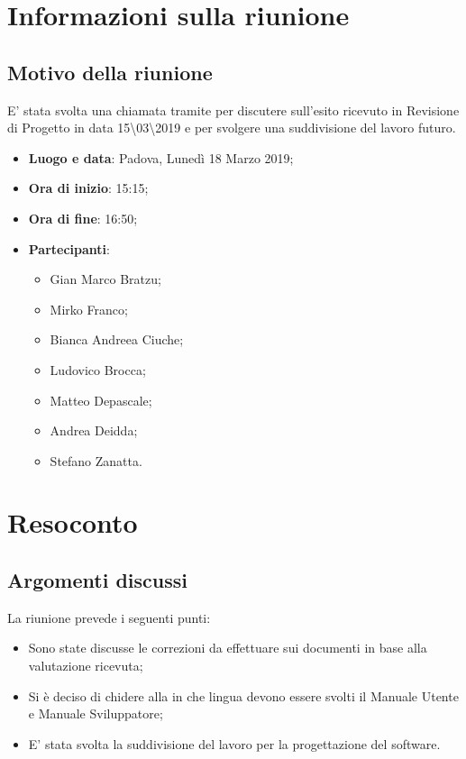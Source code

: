 \documentclass[a4paper,12pt]{article}
\begin{document}
	\tableofcontents
	\cleardoublepage
	\section{Informazioni sulla riunione}
	\subsection{Motivo della riunione} E' stata svolta una chiamata tramite   per discutere sull'esito ricevuto in Revisione di Progetto in data 15\textbackslash03\textbackslash2019 e per svolgere una suddivisione del lavoro futuro.
	\begin{itemize}
		\item \textbf{Luogo e data}: Padova, Lunedì \label{key}18 Marzo 2019;
		\item \textbf{Ora di inizio}: 15:15;
		\item \textbf{Ora di fine}: 16:50;
		\item \textbf{Partecipanti}:  
		\begin{itemize}
			\item Gian Marco Bratzu;
			\item Mirko Franco;
			\item Bianca Andreea Ciuche;
			\item Ludovico Brocca;
			\item Matteo Depascale;
			\item Andrea Deidda;
			\item Stefano Zanatta.
		\end{itemize}
	\end{itemize}
	
	
	\section{Resoconto}
	\subsection{Argomenti discussi}
	La riunione prevede i seguenti punti:
	\begin{itemize}		
		\item Sono state discusse le correzioni da effettuare sui documenti in base alla valutazione ricevuta;
		\item Si è deciso di chidere alla   in che lingua devono essere svolti  il Manuale Utente e Manuale Sviluppatore;
		\item E' stata svolta la suddivisione del lavoro per la progettazione del software.
	\end{itemize}
\end{document}
